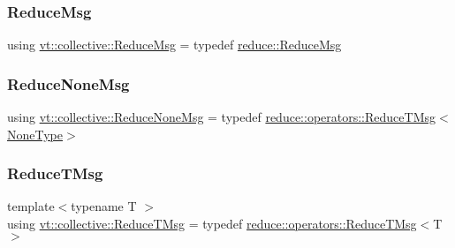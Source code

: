 \subsubsection{\texorpdfstring{Reduce\+Msg}{ReduceMsg}}
{\footnotesize\ttfamily using \hyperlink{namespacevt_1_1collective_a4c5bf7769ad4396573d6bcc85ec430a4}{vt\+::collective\+::\+Reduce\+Msg} = typedef \hyperlink{structvt_1_1collective_1_1reduce_1_1_reduce_msg}{reduce\+::\+Reduce\+Msg}}

\mbox{\label{namespacevt_1_1collective_aa439a90f05078f2bcf918641c951946f}} 
\subsubsection{\texorpdfstring{Reduce\+None\+Msg}{ReduceNoneMsg}}
{\footnotesize\ttfamily using \hyperlink{namespacevt_1_1collective_aa439a90f05078f2bcf918641c951946f}{vt\+::collective\+::\+Reduce\+None\+Msg} = typedef \hyperlink{structvt_1_1collective_1_1reduce_1_1operators_1_1_reduce_t_msg}{reduce\+::operators\+::\+Reduce\+T\+Msg}$<$\hyperlink{namespacevt_1_1collective_af988b64711231f96d33ebfaf891e52a4}{None\+Type}$>$}

\mbox{\label{namespacevt_1_1collective_a28b82d5d48c9bc6e4fd738fcbf9e0f62}} 
\subsubsection{\texorpdfstring{Reduce\+T\+Msg}{ReduceTMsg}}
{\footnotesize\ttfamily template$<$typename T $>$ \\
using \hyperlink{namespacevt_1_1collective_a28b82d5d48c9bc6e4fd738fcbf9e0f62}{vt\+::collective\+::\+Reduce\+T\+Msg} = typedef \hyperlink{structvt_1_1collective_1_1reduce_1_1operators_1_1_reduce_t_msg}{reduce\+::operators\+::\+Reduce\+T\+Msg}$<$T$>$}

\mbox{\label{namespacevt_1_1collective_a711b5dd8547fee4b63077f44188959f4}} 
